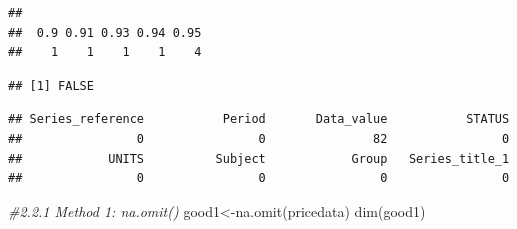 \documentclass[
  landscape]{article}
\newenvironment{Shaded}{\begin{snugshade}}{\end{snugshade}}
\newcommand{\CommentTok}[1]{\textcolor[rgb]{0.56,0.35,0.01}{\textit{#1}}}
\newcommand{\DecValTok}[1]{\textcolor[rgb]{0.00,0.00,0.81}{#1}}
\newcommand{\FunctionTok}[1]{\textcolor[rgb]{0.00,0.00,0.00}{#1}}
\newcommand{\NormalTok}[1]{#1}
\newcommand{\OtherTok}[1]{\textcolor[rgb]{0.56,0.35,0.01}{#1}}
\newcommand{\SpecialCharTok}[1]{\textcolor[rgb]{0.00,0.00,0.00}{#1}}
\begin{document}
\begin{Shaded}
\end{Shaded}

\begin{verbatim}
## 
##  0.9 0.91 0.93 0.94 0.95 
##    1    1    1    1    4
\end{verbatim}

\begin{Shaded}
\end{Shaded}

\begin{verbatim}
## [1] FALSE
\end{verbatim}

\begin{Shaded}
\end{Shaded}

\begin{verbatim}
## Series_reference           Period       Data_value           STATUS 
##                0                0               82                0 
##            UNITS          Subject            Group   Series_title_1 
##                0                0                0                0
\end{verbatim}

\begin{Shaded}
\begin{Highlighting}[]
\CommentTok{\#2.2.1 Method 1: na.omit()}
\NormalTok{good1}\OtherTok{\textless{}{-}}\FunctionTok{na.omit}\NormalTok{(pricedata)}
\FunctionTok{dim}\NormalTok{(good1)}
\end{Highlighting}
\end{Shaded}
\end{document}
